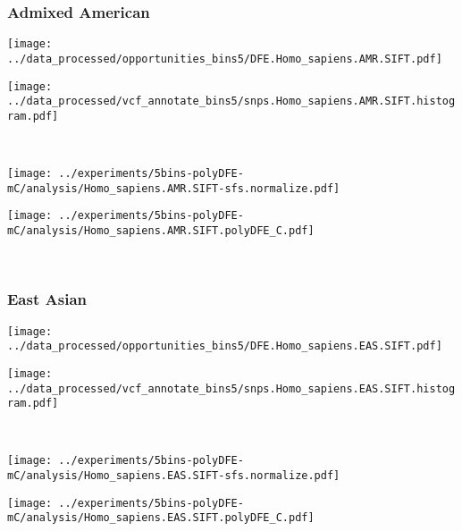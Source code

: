 \subsubsection{Admixed American}

\begin{minipage}{0.49\linewidth}
    \texttt{[image: ../data\_processed/opportunities\_bins5/DFE.Homo\_sapiens.AMR.SIFT.pdf]}
\end{minipage}
\begin{minipage}{0.49\linewidth}
    \texttt{[image: ../data\_processed/vcf\_annotate\_bins5/snps.Homo\_sapiens.AMR.SIFT.histogram.pdf]}
\end{minipage}
\\
\begin{minipage}{0.49\linewidth}
    \texttt{[image: ../experiments/5bins-polyDFE-mC/analysis/Homo\_sapiens.AMR.SIFT-sfs.normalize.pdf]}
\end{minipage}
\begin{minipage}{0.49\linewidth}
    \texttt{[image: ../experiments/5bins-polyDFE-mC/analysis/Homo\_sapiens.AMR.SIFT.polyDFE\_C.pdf]}
\end{minipage}
\\

\subsubsection{East Asian}

\begin{minipage}{0.49\linewidth}
    \texttt{[image: ../data\_processed/opportunities\_bins5/DFE.Homo\_sapiens.EAS.SIFT.pdf]}
\end{minipage}
\begin{minipage}{0.49\linewidth}
    \texttt{[image: ../data\_processed/vcf\_annotate\_bins5/snps.Homo\_sapiens.EAS.SIFT.histogram.pdf]}
\end{minipage}
\\
\begin{minipage}{0.49\linewidth}
    \texttt{[image: ../experiments/5bins-polyDFE-mC/analysis/Homo\_sapiens.EAS.SIFT-sfs.normalize.pdf]}
\end{minipage}
\begin{minipage}{0.49\linewidth}
    \texttt{[image: ../experiments/5bins-polyDFE-mC/analysis/Homo\_sapiens.EAS.SIFT.polyDFE\_C.pdf]}
\end{minipage}
\\

